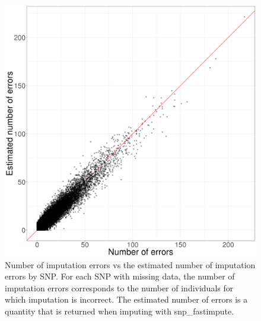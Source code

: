 \documentclass[a4paper, 11pt]{article}
\begin{document}
\vspace{3em}

\begin{figure}[!h]
\centerline{\includegraphics[width=\textwidth]{error-impute}}
\caption{Number of imputation errors vs the estimated number of imputation errors by SNP. For each SNP with missing data, the number of imputation errors corresponds to the number of individuals for which imputation is incorrect. The estimated number of errors is a quantity that is returned when imputing with snp\_fastimpute.}\label{fig:error-impute}
\end{figure}

\vspace{3em}
\end{document}
